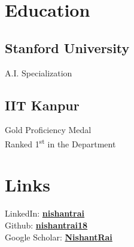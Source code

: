 \documentclass[]{cv-openfont}
\begin{document}
%
%
\detailedCV

%
%

%
%

\begin{minipage}[t]{0.31\textwidth} 


\section{Education} 

\subsection{Stanford University}
A.I. Specialization
\sectionsep

\subsection{IIT Kanpur}
Gold Proficiency Medal\\
Ranked 1\textsuperscript{st} in the Department\\


\section{Links} 
LinkedIn:  \href{https://www.linkedin.com/in/nishant-rai-9467ab111}{\bf nishantrai} \\
Github: \href{https://github.com/nishantrai18}{\bf nishantrai18} \\
Google Scholar: \href{https://scholar.google.co.in/citations?user=akErVwcAAAAJ&hl=en}{\bf NishantRai} \\


\end{minipage}
\end{document}
